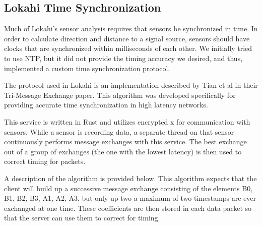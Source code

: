 \subsection{Lokahi Time Synchronization}\label{subsec:lokahi-time-synchronization}
Much of Lokahi's sensor analysis requires that sensors be synchronized in time. In order to calculate direction and distance to a signal source, sensors should have clocks that are synchronized within milliseconds of each other. We initially tried to use NTP, but it did not provide the timing accuracy we desired, and thus, implemented a custom time synchronization protocol.

The protocol used in Lokahi is an implementation described by Tian et al in their Tri-Message Exchange paper\cite{tian2009tri}. This algorithm was developed specifically for providing accurate time synchronization in high latency networks.

This service is written in Rust and utilizes encrypted x for communication with sensors. While a sensor is recording data, a separate thread on that sensor continuously performs message exchanges with this service. The best exchange out of a group of exchanges (the one with the lowest latency) is then used to correct timing for packets.

A description of the algorithm is provided below. This algorithm expects that the client will build up a successive message exchange consisting of the elements B0, B1, B2, B3, A1, A2, A3, but only up two a maximum of two timestamps are ever exchanged at one time. These coefficients are then stored in each data packet so that the server can use them to correct for timing.

